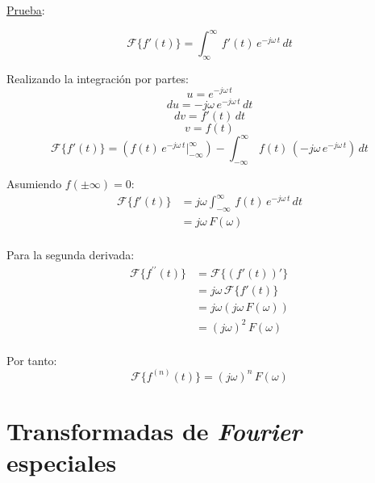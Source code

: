\underline{Prueba}:

\begin{equation*}
    \mathcal{F}\{f'(t)\}=\int_{\infty}^\infty\,f'(t)\,e^{-j\omega\,t}\,dt
\end{equation*}

Realizando la integración por partes:
\begin{equation*}
    u=e^{-j\omega\,t}
\end{equation*}
\begin{equation*}
    du=-j\omega\,e^{-j\omega\,t}\,dt
\end{equation*}
\begin{equation*}
    dv=f'(t)\,dt
\end{equation*}
\begin{equation*}
    v=f(t)
\end{equation*}
\begin{equation*}
    \mathcal{F}\{f'(t)\}
        =\left(f(t)\,e^{-j\omega\,t}\Biggr|_{-\infty}^\infty\right)
        -\int_{-\infty}^\infty\,f(t)\,(-j\omega\,e^{-j\omega\,t})\,dt
\end{equation*}

Asumiendo $f(\pm\infty)=0$:
\begin{equation*}
\begin{split}
    \mathcal{F}\{f'(t)\}
        &=j\omega\int_{-\infty}^\infty\,f(t)\,e^{-j\omega\,t}\,dt\\
        &=j\omega\,F(\omega)\\
\end{split}
\end{equation*}

Para la segunda derivada:
\begin{equation*}
\begin{split}
    \mathcal{F}\{f^{\prime\prime}(t)\}
        &=\mathcal{F}\{(f'(t))'\}\\
        &=j\omega\,\mathcal{F}\{f'(t)\}\\
        &=j\omega(j\omega\,F(\omega))\\
        &={(j\omega)}^2\,F(\omega)\\
\end{split}
\end{equation*}

Por tanto:
\begin{equation*}
    \mathcal{F}\{f^{(n)}(t)\}={(j\omega)}^n\,F(\omega)
\end{equation*}

\section{Transformadas de \emph{Fourier} especiales}
